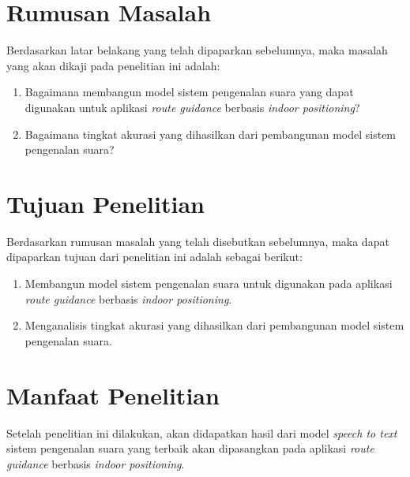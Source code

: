 \fancyhf{} 
\fancyfoot[R]{\thepage}

\section{Rumusan Masalah}
Berdasarkan latar belakang yang telah dipaparkan sebelumnya, maka masalah yang akan dikaji pada penelitian ini adalah:
\begin{enumerate}
	\item Bagaimana membangun model sistem pengenalan suara yang dapat digunakan untuk aplikasi \textit{route guidance} berbasis \textit{indoor positioning}?
	\item Bagaimana tingkat akurasi yang dihasilkan dari pembangunan model sistem pengenalan suara?
\end{enumerate}

\section{Tujuan Penelitian}
Berdasarkan rumusan masalah yang telah disebutkan sebelumnya, maka dapat dipaparkan tujuan dari penelitian ini adalah sebagai berikut: 
\begin{enumerate}
	\item Membangun model sistem pengenalan suara untuk digunakan pada aplikasi \textit{route guidance} berbasis \textit{indoor positioning}.
	\item Menganalisis tingkat akurasi yang dihasilkan dari pembangunan model sistem pengenalan suara.
\end{enumerate}


\section{Manfaat Penelitian}
Setelah penelitian ini dilakukan, akan didapatkan hasil dari model \textit{speech to text} sistem pengenalan suara yang terbaik akan dipasangkan pada aplikasi \textit{route guidance} berbasis \textit{indoor positioning}.

\begin{comment}

\end{comment}